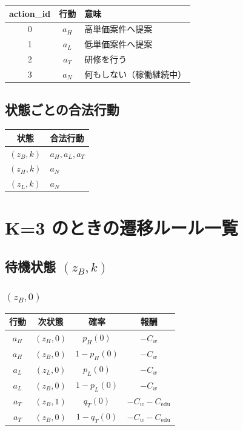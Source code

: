 \documentclass[11pt,a4paper]{bxjsarticle}
\begin{document}
\begin{table}[H]
\centering
\begin{tabular}{ccl}
\toprule
action\_id & 行動 & 意味 \\
\midrule
0 & \(a_H\) & 高単価案件へ提案 \\
1 & \(a_L\) & 低単価案件へ提案 \\
2 & \(a_T\) & 研修を行う \\
3 & \(a_N\) & 何もしない（稼働継続中） \\
\bottomrule
\end{tabular}
\end{table}

\subsection{状態ごとの合法行動}

\begin{table}[H]
\centering
\begin{tabular}{cl}
\toprule
状態 & 合法行動 \\
\midrule
\((z_B,k)\) & \(a_H, a_L, a_T\) \\
\((z_H,k)\) & \(a_N\) \\
\((z_L,k)\) & \(a_N\) \\
\bottomrule
\end{tabular}
\end{table}

\section{K=3 のときの遷移ルール一覧}

\subsection{待機状態 \((z_B,k)\)}

\subsubsection*{\((z_B,0)\)}
\begin{table}[H]
\centering
\begin{tabular}{cccc}
\toprule
行動 & 次状態 & 確率 & 報酬 \\
\midrule
\(a_H\) & \((z_H,0)\) & \(p_H(0)\) & \(-C_w\) \\
\(a_H\) & \((z_B,0)\) & \(1-p_H(0)\) & \(-C_w\) \\
\(a_L\) & \((z_L,0)\) & \(p_L(0)\) & \(-C_w\) \\
\(a_L\) & \((z_B,0)\) & \(1-p_L(0)\) & \(-C_w\) \\
\(a_T\) & \((z_B,1)\) & \(q_T(0)\) & \(-C_w-C_{\mathrm{edu}}\) \\
\(a_T\) & \((z_B,0)\) & \(1-q_T(0)\) & \(-C_w-C_{\mathrm{edu}}\) \\
\bottomrule
\end{tabular}
\end{table}
\end{document}
